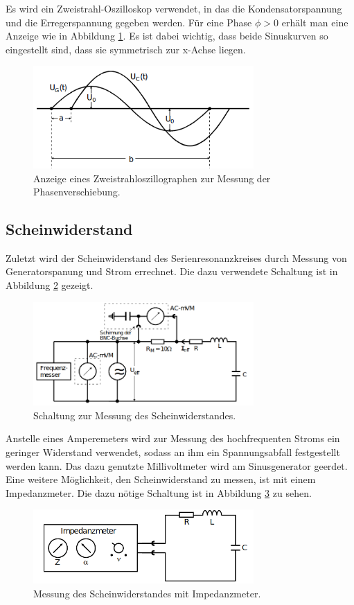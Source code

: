     \noindent Es wird ein Zweistrahl-Oszilloskop verwendet, in das die 
    Kondensatorspannung und die Erregerspannung gegeben werden. 
    Für eine Phase $\phi > 0$ erhält man eine Anzeige wie in Abbildung
    \ref{fig:verschiebung}. Es ist dabei wichtig, dass beide Sinuskurven
    so eingestellt sind, dass sie symmetrisch zur x-Achse liegen.

    \begin{figure}
        \centering
        \includegraphics[width=0.75\textwidth]{5d2.png}
        \caption{Anzeige eines Zweistrahloszillographen zur Messung der Phasenverschiebung. \cite{analt}}
        \label{fig:verschiebung}
    \end{figure}

\subsection{Scheinwiderstand}
    Zuletzt wird der Scheinwiderstand des Serienresonanzkreises durch 
    Messung von Generatorspanung und Strom errechnet. Die dazu verwendete
    Schaltung ist in Abbildung \ref{fig:5e} gezeigt.

    \begin{figure}
        \centering
        \includegraphics[width=0.75\textwidth]{5e.png}
        \caption{Schaltung zur Messung des Scheinwiderstandes.\cite{anleitung}}
        \label{fig:5e}
    \end{figure}

    \noindent Anstelle eines Amperemeters wird zur Messung des hochfrequenten 
    Stroms ein geringer Widerstand verwendet, sodass an ihm ein Spannungsabfall 
    festgestellt werden kann. Das dazu genutzte Millivoltmeter wird am Sinusgenerator
    geerdet. \\
    Eine weitere Möglichkeit, den Scheinwiderstand zu messen, ist mit einem Impedanzmeter.
    Die dazu nötige Schaltung ist in Abbildung \ref{fig:5e2} zu sehen.

    \begin{figure}
        \centering
        \includegraphics[width=0.75\textwidth]{5e2.png}
        \caption{Messung des Scheinwiderstandes mit Impedanzmeter.\cite{anleitung}}
        \label{fig:5e2}
    \end{figure}
